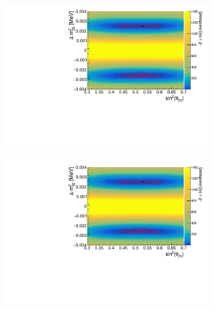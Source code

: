 \begin{figure}[h]
  \begin{subfigure}[t]{0.5\textwidth}
    \includegraphics[width=\textwidth, trim={0mm 0mm 0mm 0mm}, clip,page=1]{Figures/OA/DisappearanceScans.pdf}
  \end{subfigure}%
  \begin{subfigure}[t]{0.5\textwidth}
    \includegraphics[width=\textwidth, trim={0mm 0mm 0mm 0mm}, clip,page=2]{Figures/OA/DisappearanceScans.pdf}
  \end{subfigure}
  \begin{subfigure}[t]{1.0\textwidth}

\end{subfigure}
\end{figure}

